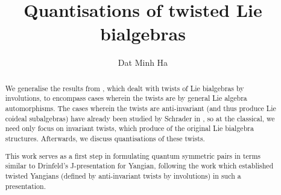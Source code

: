 

\setcounter{section}{-1}





	\title{Quantisations of twisted Lie bialgebras}
	
	\author{Dat Minh Ha}
	\maketitle
	
	\begin{abstract}
	    We generalise the results from \cite{belliard_crampe_coideal_subalgebras_from_twisted_manin_triples}, which dealt with twists of Lie bialgebras by involutions, to encompass cases wherein the twists are by general Lie algebra automorphisms. The cases wherein the twists are anti-invariant (and thus produce Lie coideal subalgebras) have already been studied by Schrader in \cite{schrader_integrable_systems_from_classical_reflection_equations}, so at the classical, we need only focus on invariant twists, which produce  of the original Lie bialgebra structures. Afterwards, we discuss quantisations of these twists.
        
        This work serves as a first step in formulating quantum symmetric pairs in terms similar to Drinfeld's J-presentation for Yangian, following the work \cite{belliard_regelskis_J_presentation_for_twisted_yangians} which established twisted Yangians (defined by anti-invariant twists by involutions) in such a presentation.
	\end{abstract}
	
	{
      \hypersetup{} 
      \tableofcontents %
    }

    \listoftodos

    

    

    

    

    

